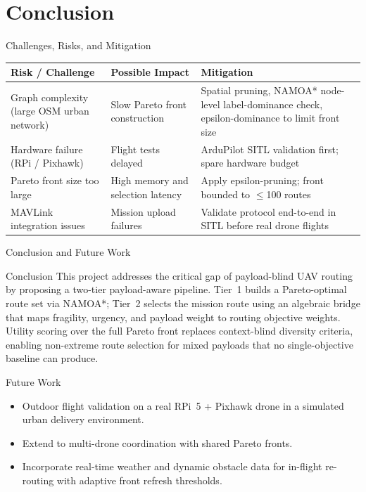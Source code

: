\documentclass[aspectratio=169,11pt]{beamer}
\begin{document}
\section{Conclusion}

\begin{frame}{Challenges, Risks, and Mitigation}
  \small
  \begin{tabularx}{\textwidth}{Y Y Y}
    \toprule
    \textbf{Risk / Challenge} & \textbf{Possible Impact} &
    \textbf{Mitigation}\\
    \midrule
    Graph complexity (large OSM urban network) &
      Slow Pareto front construction &
      Spatial pruning, NAMOA* node-level label-dominance check,
      epsilon-dominance to limit front size\\
    Hardware failure (RPi / Pixhawk) &
      Flight tests delayed &
      ArduPilot SITL validation first; spare hardware budget\\
    Pareto front size too large &
      High memory and selection latency &
      Apply epsilon-pruning; front bounded to $\leq$100 routes\\
    MAVLink integration issues &
      Mission upload failures &
      Validate protocol end-to-end in SITL before real drone flights\\
    \bottomrule
  \end{tabularx}
\end{frame}

\begin{frame}{Conclusion and Future Work}
  \begin{block}{Conclusion}
    This project addresses the critical gap of payload-blind UAV routing by
    proposing a two-tier payload-aware pipeline.  Tier~1 builds a Pareto-optimal
    route set via NAMOA*; Tier~2 selects the mission route using an algebraic
    bridge that maps fragility, urgency, and payload weight to routing
    objective weights.  Utility scoring over the full Pareto front replaces
    context-blind diversity criteria, enabling non-extreme route selection for
    mixed payloads that no single-objective baseline can produce.
  \end{block}
  \begin{block}{Future Work}
    \begin{itemize}
      \item Outdoor flight validation on a real RPi~5 + Pixhawk drone in a
            simulated urban delivery environment.
      \item Extend to multi-drone coordination with shared Pareto fronts.
      \item Incorporate real-time weather and dynamic obstacle data for
            in-flight re-routing with adaptive front refresh thresholds.
    \end{itemize}
  \end{block}
\end{frame}
\end{document}
